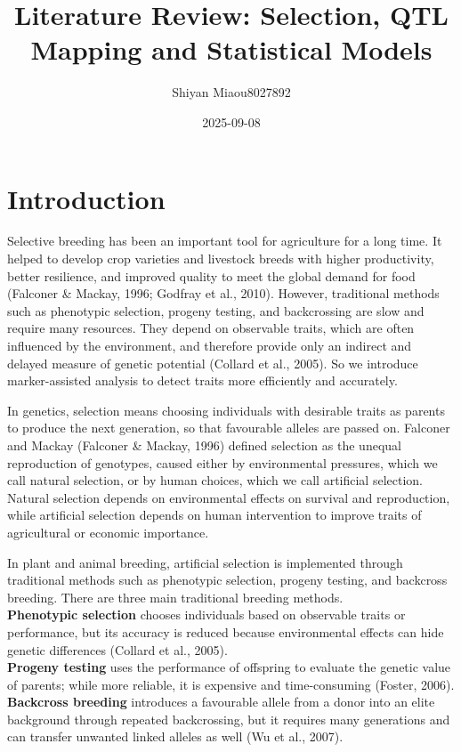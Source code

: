 \documentclass[
  letterpaper,
  DIV=11,
  numbers=noendperiod]{scrartcl}
\title{Literature Review: Selection, QTL Mapping and Statistical Models}
\author{Shiyan Miao\textbar u8027892}
\date{2025-09-08}
\renewcommand*\contentsname{Table of contents}
\newcommand\contentsname{Table of contents}
\begin{document}
\maketitle

\renewcommand*\contentsname{Table of contents}
{
\hypersetup{linkcolor=}
\setcounter{tocdepth}{3}
\tableofcontents
}

\section{Introduction}\label{introduction}

Selective breeding has been an important tool for agriculture for a long
time. It helped to develop crop varieties and livestock breeds with
higher productivity, better resilience, and improved quality to meet the
global demand for food (Falconer \& Mackay, 1996; Godfray et al., 2010).
However, traditional methods such as phenotypic selection, progeny
testing, and backcrossing are slow and require many resources. They
depend on observable traits, which are often influenced by the
environment, and therefore provide only an indirect and delayed measure
of genetic potential (Collard et al., 2005). So we introduce
marker-assisted analysis to detect traits more efficiently and
accurately.

In genetics, selection means choosing individuals with desirable traits
as parents to produce the next generation, so that favourable alleles
are passed on. Falconer and Mackay (Falconer \& Mackay, 1996) defined
selection as the unequal reproduction of genotypes, caused either by
environmental pressures, which we call natural selection, or by human
choices, which we call artificial selection. Natural selection depends
on environmental effects on survival and reproduction, while artificial
selection depends on human intervention to improve traits of
agricultural or economic importance.

In plant and animal breeding, artificial selection is implemented
through traditional methods such as phenotypic selection, progeny
testing, and backcross breeding. There are three main traditional
breeding methods.\\
\textbf{Phenotypic selection} chooses individuals based on observable
traits or performance, but its accuracy is reduced because environmental
effects can hide genetic differences (Collard et al., 2005).\\
\textbf{Progeny testing} uses the performance of offspring to evaluate
the genetic value of parents; while more reliable, it is expensive and
time-consuming (Foster, 2006).\\
\textbf{Backcross breeding} introduces a favourable allele from a donor
into an elite background through repeated backcrossing, but it requires
many generations and can transfer unwanted linked alleles as well (Wu et
al., 2007).
\end{document}
